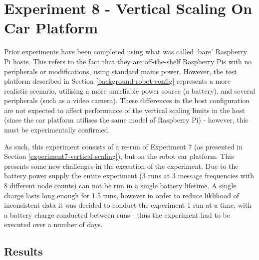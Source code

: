 \documentclass[../dissertation.tex]{subfiles}
\begin{document}
\section{Experiment 8 - Vertical Scaling On Car Platform}
\label{experiment8-vertical-scaling}

Prior experiments have been completed using what was called `bare' Raspberry Pi hosts. This refers to the fact that they are off-the-shelf Raspberry Pis with no peripherals or modifications, using standard mains power. However, the test platform described in Section \ref{background-robot-config} represents a more realistic scenario, utilising a more unreliable power source (a battery), and several peripherals (such as a video camera). These differences in the host configuration are not expected to affect performance of the vertical scaling limits in the host (since the car platform utilises the same model of Raspberry Pi) - however, this must be experimentally confirmed.

As such, this experiment consists of a re-run of Experiment 7 (as presented in Section \ref{experiment7-vertical-scaling}), but on the robot car platform. This presents some new challenges in the execution of the experiment. Due to the battery power supply the entire experiment (3 runs at 3 message frequencies with 8 different node counts) can not be run in a single battery lifetime. A single charge lasts long enough for 1.5 runs, however in order to reduce liklihood of inconsistent data it was decided to conduct the experiment 1 run at a time, with a battery charge conducted between runs - thus the experiment had to be executed over a number of days.

\subsection{Results}
\end{document}
